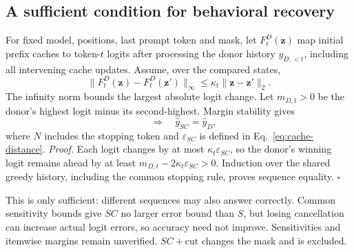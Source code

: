 \subsection{A sufficient condition for behavioral recovery}
\label{app:behavior-recovery}

For fixed model, positions, last prompt token and mask, let $F_t^D(\mathbf z)$
map initial prefix caches to token-$t$ logits after processing the donor
history $y_{D,<t}$, including all intervening cache updates.
Assume, over the compared states,
\begin{equation}
\|F_t^D(\mathbf z)-F_t^D(\mathbf z')\|_\infty
\le\kappa_t\|\mathbf z-\mathbf z'\|_2.
\label{eq:cache-lipschitz}
\end{equation}
The infinity norm bounds the largest absolute logit change. Let
$m_{D,t}>0$ be the donor's highest logit minus its second-highest.
Margin stability \citep{tsuzuku2018lipschitz} gives
\begin{equation}
[\ \forall t\le N:\ 2\kappa_t\varepsilon_{SC}<m_{D,t}\ ]
\quad\Longrightarrow\quad \hat y_{SC}=\hat y_D,
\label{eq:sequence-recovery}
\end{equation}
where $N$ includes the stopping token and $\varepsilon_{SC}$ is defined
in Eq.~\eqref{eq:cache-distance}.
\emph{Proof.} Each logit changes by at most $\kappa_t\varepsilon_{SC}$,
so the donor's winning logit remains ahead by at least
$m_{D,t}-2\kappa_t\varepsilon_{SC}>0$. Induction over the shared greedy
history, including the common stopping rule, proves sequence equality.
\hfill$\square$

This is only sufficient: different sequences may also answer correctly.
Common sensitivity bounds give $SC$ no larger error bound than $S$,
but losing cancellation can increase actual logit errors, so accuracy need
not improve. Sensitivities and itemwise margins remain unverified.
$SC+\mathrm{cut}$ changes the mask and is excluded.
